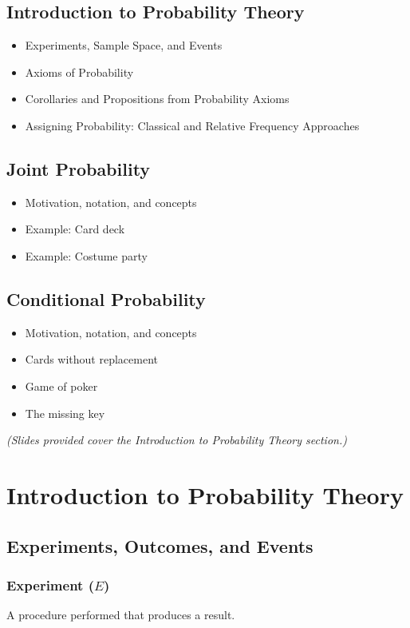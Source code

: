 \documentclass[12pt]{article}
\begin{document}
\subsection*{Introduction to Probability Theory}
\begin{itemize}
\item Experiments, Sample Space, and Events
\item Axioms of Probability
\item Corollaries and Propositions from Probability Axioms
\item Assigning Probability: Classical and Relative Frequency Approaches
\end{itemize}

\subsection*{Joint Probability}
\begin{itemize}
\item Motivation, notation, and concepts
\item Example: Card deck
\item Example: Costume party
\end{itemize}

\subsection*{Conditional Probability}
\begin{itemize}
\item Motivation, notation, and concepts
\item Cards without replacement
\item Game of poker
\item The missing key
\end{itemize}

\textit{(Slides provided cover the Introduction to Probability Theory section.)}

\section{Introduction to Probability Theory}

\subsection{Experiments, Outcomes, and Events}

\subsubsection*{Experiment ($E$)}
A procedure performed that produces a result.
\end{document}
